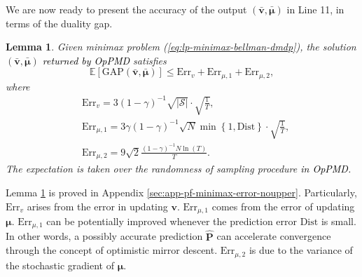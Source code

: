 \documentclass[12pt]{article}
\newtheorem{lemma}{Lemma}
\begin{document}
We are now ready to present the accuracy of the output $(\bar{\boldsymbol{v}},\bar{\boldsymbol{\mu}})$ in Line 11, in terms of the duality gap.
\begin{lemma}
    Given minimax problem (\ref{eq:lp-minimax-bellman-dmdp}), the solution $(\bar{\boldsymbol{v}},\bar{\boldsymbol{\mu}})$ \textcolor{black}{returned by OpPMD} satisfies
    \begin{equation*}
        \mathbb{E}[\text{GAP}(\bar{\boldsymbol{v}},\bar{\boldsymbol{\mu}})] \le \text{Err}_{v} + \text{Err}_{\mu,1} + \text{Err}_{\mu,2},
    \end{equation*}
    where
    \begin{equation*}
        \begin{aligned}
            & \text{Err}_{v} = 3 (1-\gamma)^{-1}\sqrt{|\mathcal{S}|} \cdot \sqrt{\frac{1}{T}} ,\\
            & \text{Err}_{\mu,1} = 3 \gamma (1-\gamma)^{-1}\sqrt{N} \min \left\{1,\text{Dist} \right\} \cdot \sqrt{\frac{1}{T}},\\
            & \text{Err}_{\mu,2} = 9 \sqrt{2} \frac{(1-\gamma)^{-1}N \ln(T)}{T}.
        \end{aligned}
    \end{equation*}
    The expectation is taken over the randomness of sampling procedure \textcolor{black}{in OpPMD.}
    \label{lem:minimax-error-noupper}
\end{lemma}

Lemma \ref{lem:minimax-error-noupper} is proved in Appendix \ref{sec:app-pf-minimax-error-noupper}. Particularly, $\text{Err}_{v}$ arises from the error in updating $\boldsymbol{v}$. $\text{Err}_{\mu,1}$ comes from the error of updating $\boldsymbol{\mu}$. $\text{Err}_{\mu,1}$ can be potentially improved whenever the prediction error $\text{Dist}$ is small. In other words, a possibly accurate prediction $\hat{\boldsymbol{\text{P}}}$ can accelerate convergence through the concept of optimistic mirror descent.
$\text{Err}_{\mu,2}$ is due to the variance of the stochastic gradient of $\boldsymbol{\mu}$.
\end{document}
